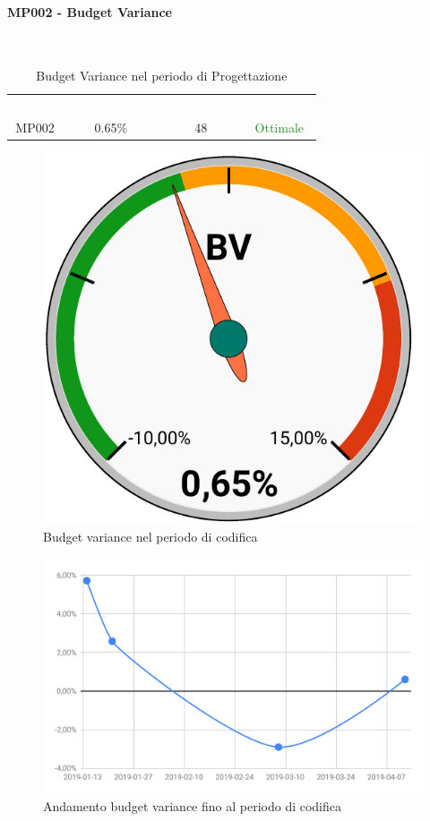 \paragraph{MP002 - Budget Variance}\mbox{}\\[0,3cm]
    \begin{table}[H]
        \centering
        \begin{tabular}{cccc}
            \rowcolor{greySWEight}
            \textcolor{white}{\textbf{Codice}} &
            \textcolor{white}{\textbf{Valore Indice}}&
            \textcolor{white}{\textbf{Valore in €}}&
            \textcolor{white}{\textbf{Riscontro}}\\
            MP002 & 0.65\% & 48 & \textcolor{ForestGreen}{Ottimale}\\
        \end{tabular}
        \caption{Budget Variance nel periodo di Progettazione}
    \end{table}
    \begin{figure}[H]
        \centering
        \includegraphics[width=0.3\linewidth]{sez/App_Esito/Qualifica/graph/BV_RQ.pdf}
        \caption{Budget variance nel periodo di codifica}
    \end{figure}
    \begin{figure}[H]
        \centering
        \includegraphics[width=0.7\linewidth]{sez/App_Esito/Qualifica/graph/storicoBV_RQ.pdf}
        \caption{Andamento budget variance fino al periodo di codifica}
    \end{figure}